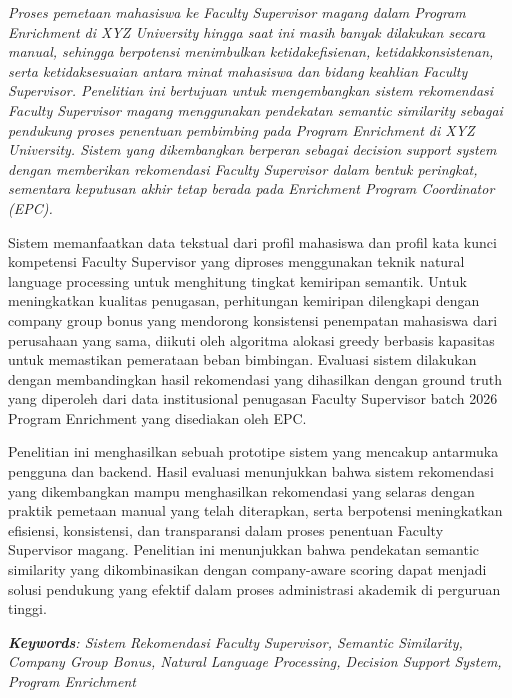 \begin{singlespace}
{\itshape
Proses pemetaan mahasiswa ke Faculty Supervisor magang dalam Program Enrichment di XYZ University hingga saat ini masih banyak dilakukan secara manual, sehingga berpotensi menimbulkan ketidakefisienan, ketidakkonsistenan, serta ketidaksesuaian antara minat mahasiswa dan bidang keahlian Faculty Supervisor. Penelitian ini bertujuan untuk mengembangkan sistem rekomendasi Faculty Supervisor magang menggunakan pendekatan semantic similarity sebagai pendukung proses penentuan pembimbing pada Program Enrichment di XYZ University. Sistem yang dikembangkan berperan sebagai decision support system dengan memberikan rekomendasi Faculty Supervisor dalam bentuk peringkat, sementara keputusan akhir tetap berada pada \textit{Enrichment Program Coordinator} (EPC).

Sistem memanfaatkan data tekstual dari profil mahasiswa dan profil kata kunci kompetensi Faculty Supervisor yang diproses menggunakan teknik natural language processing untuk menghitung tingkat kemiripan semantik. Untuk meningkatkan kualitas penugasan, perhitungan kemiripan dilengkapi dengan company group bonus yang mendorong konsistensi penempatan mahasiswa dari perusahaan yang sama, diikuti oleh algoritma alokasi greedy berbasis kapasitas untuk memastikan pemerataan beban bimbingan. Evaluasi sistem dilakukan dengan membandingkan hasil rekomendasi yang dihasilkan dengan ground truth yang diperoleh dari data institusional penugasan Faculty Supervisor batch 2026 Program Enrichment yang disediakan oleh EPC.

Penelitian ini menghasilkan sebuah prototipe sistem yang mencakup antarmuka pengguna dan backend. Hasil evaluasi menunjukkan bahwa sistem rekomendasi yang dikembangkan mampu menghasilkan rekomendasi yang selaras dengan praktik pemetaan manual yang telah diterapkan, serta berpotensi meningkatkan efisiensi, konsistensi, dan transparansi dalam proses penentuan Faculty Supervisor magang. Penelitian ini menunjukkan bahwa pendekatan semantic similarity yang dikombinasikan dengan company-aware scoring dapat menjadi solusi pendukung yang efektif dalam proses administrasi akademik di perguruan tinggi.

\textit{\noindent\textbf{Keywords}: Sistem Rekomendasi Faculty Supervisor, Semantic Similarity, Company Group Bonus, Natural Language Processing, Decision Support System, Program Enrichment}

}
\end{singlespace}
\par

